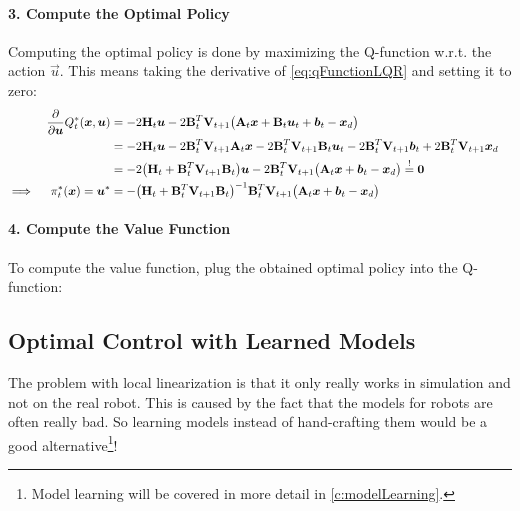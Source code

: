 				\paragraph{3. Compute the Optimal Policy}
					Computing the optimal policy is done by maximizing the Q-function w.r.t. the action \(\vec{u}\). This means taking the derivative of \eqref{eq:qFunctionLQR} and setting it to zero:
					\begin{align*}
						&& \pdv{\bm{u}} Q_t^\ast(\bm{x}, \bm{u})
							&= -2 \bm{\mathrm{H}}_t \bm{u} - 2 \bm{\mathrm{B}}_t^T \bm{\mathrm{V}}_{t + 1} \big( \bm{\mathrm{A}}_t \bm{x} + \bm{\mathrm{B}}_t \bm{u}_t + \bm{b}_t - \bm{x}_d \big) & \\
						&&	&= -2 \bm{\mathrm{H}}_t \bm{u} - 2 \bm{\mathrm{B}}_t^T \bm{\mathrm{V}}_{t + 1} \bm{\mathrm{A}}_t \bm{x} - 2 \bm{\mathrm{B}}_t^T \bm{\mathrm{V}}_{t + 1} \bm{\mathrm{B}}_t \bm{u}_t - 2 \bm{\mathrm{B}}_t^T \bm{\mathrm{V}}_{t + 1} \bm{b}_t + 2 \bm{\mathrm{B}}_t^T \bm{\mathrm{V}}_{t + 1} \bm{x}_d & \\
						&&	&= -2 \big( \bm{\mathrm{H}}_t + \bm{\mathrm{B}}_t^T \bm{\mathrm{V}}_{t + 1} \bm{\mathrm{B}}_t \big) \bm{u} - 2 \bm{\mathrm{B}}_t^T \bm{\mathrm{V}}_{t + 1} \big( \bm{\mathrm{A}}_t \bm{x} + \bm{b}_t - \bm{x}_d \big) \overset{!}{=} \bm{0} & \\
						\implies && \pi_t^\ast(\bm{x}) = \bm{u}^\ast &= -\big( \bm{\mathrm{H}}_t + \bm{\mathrm{B}}_t^T \bm{\mathrm{V}}_{t + 1} \bm{\mathrm{B}}_t \big)^{-1} \bm{\mathrm{B}}_t^T \bm{\mathrm{V}}_{t + 1} \big( \bm{\mathrm{A}}_t \bm{x} + \bm{b}_t - \bm{x}_d \big) &
					\end{align*}

				\paragraph{4. Compute the Value Function}
					To compute the value function, plug the obtained optimal policy into the Q-function:


		\subsection{Optimal Control with Learned Models}
			The problem with local linearization is that it only really works in simulation and not on the real robot. This is caused by the fact that the models for robots are often really bad. So learning models instead of hand-crafting them would be a good alternative\footnote{Model learning will be covered in more detail in \autoref{c:modelLearning}.}!

